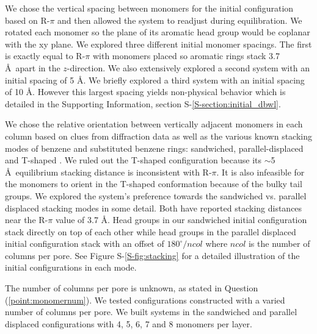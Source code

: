 \documentclass[journal=jpcbfk,manuscript=article]{achemso}
\begin{document}
  We chose the vertical spacing between monomers for the initial configuration based
  on R-$\pi$ and then allowed the system to readjust during equilibration. We rotated 
  each monomer so the plane of its aromatic head group would be coplanar with the xy plane. We
  explored three different initial monomer spacings. The first is exactly
  equal to R-$\pi$ with monomers placed so aromatic rings stack 3.7 \AA~apart in
  the $z$-direction. We also extensively explored a second system with an initial spacing of 5
  \AA. We briefly explored a third system with an initial spacing of 10
  \AA. However this largest spacing yields non-physical behavior which is detailed in the 
  Supporting Information, section S-\ref{S-section:initial_dbwl}. 


  We chose the relative orientation between vertically adjacent monomers in each column 
  based on clues from diffraction data as well as the various known stacking modes of 
  benzene and substituted benzene rings: sandwiched, parallel-displaced and T-shaped
  \cite{sinnokrot_estimates_2002}. We ruled out the T-shaped configuration
  because its $\sim$5 \AA~equilibrium stacking distance \cite{sinnokrot_estimates_2002}
  is inconsistent with R-$\pi$. It is also infeasible for the monomers to orient in the 
  T-shaped conformation because of the bulky tail groups. We explored the system's 
  preference towards the sandwiched vs. parallel displaced stacking modes in some detail.
  Both have reported stacking distances near the R-$\pi$ value of 3.7 \AA. Head groups in
  our sandwiched initial configuration stack directly on top of each other while
  head groups in the parallel displaced initial configuration stack with an offset
  of $180^\circ/ncol$ where $ncol$ is the number of columns per pore. See Figure 
  S-\ref{S-fig:stacking} for a detailed illustration of the initial configurations in each mode.
  

  The number of columns per pore is unknown, as stated in Question
  (\ref{point:monomernum}). We tested configurations constructed with a varied
  number of columns per pore. We built systems in the sandwiched and parallel
  displaced configurations with 4, 5, 6, 7 and 8 monomers per layer.
\end{document}
